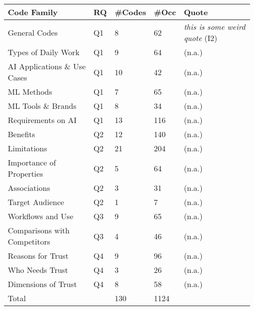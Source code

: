 \begin{tabular}{lllll}
    Code Family & RQ & \#Codes & \#Occ & Quote \\
    \toprule
    General Codes & Q1 & 8 & 62 & \emph{this is some weird quote} (I2) \\
    Types of Daily Work & Q1 & 9 & 64 & \emph{} (n.a.) \\
    AI Applications \& Use Cases & Q1 & 10 & 42 & \emph{} (n.a.) \\
    ML Methods & Q1 & 7 & 65 & \emph{} (n.a.) \\
    ML Tools \& Brands & Q1 & 8 & 34 & \emph{} (n.a.) \\
    Requirements on AI & Q1 & 13 & 116 & \emph{} (n.a.) \\
    Benefits & Q2 & 12 & 140 & \emph{} (n.a.) \\
    Limitations & Q2 & 21 & 204 & \emph{} (n.a.) \\
    Importance of Properties & Q2 & 5 & 64 & \emph{} (n.a.) \\
    Associations & Q2 & 3 & 31 & \emph{} (n.a.) \\
    Target Audience & Q2 & 1 & 7 & \emph{} (n.a.) \\
    Workflows and Use & Q3 & 9 & 65 & \emph{} (n.a.) \\
    Comparisons with Competitors & Q3 & 4 & 46 & \emph{} (n.a.) \\
    Reasons for Trust & Q4 & 9 & 96 & \emph{} (n.a.) \\
    Who Needs Trust & Q4 & 3 & 26 & \emph{} (n.a.) \\
    Dimensions of Trust & Q4 & 8 & 58 & \emph{} (n.a.) \\
    \midrule
    Total &   & 130 & 1124 &  
\end{tabular}